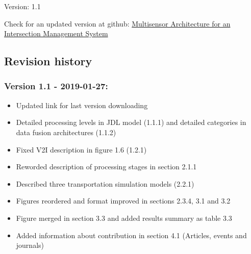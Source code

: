 \begin{titlepage}
    \begin{center}
%   
%        
%		        
%        
%        
%        
%		
%        
{}
Version: 1.1 \\
\vspace{2cm}

      
\end{center}
    
Check for an updated version at github: 
\href{https://github.com/gustavovelascoh/msc-report/wiki}{Multisensor Architecture for an Intersection Management System}


\subsection*{Revision history}
\subsubsection*{Version 1.1 - 2019-01-27:}

	\begin{itemize}
	\item Updated link for last version downloading
	\item Detailed processing levels in JDL model (1.1.1) and detailed categories in data fusion architectures (1.1.2)
	\item Fixed V2I description in figure 1.6 (1.2.1)
	\item Reworded description of processing stages in section 2.1.1
	\item Described three transportation simulation models (2.2.1)
	\item Figures reordered and format improved in sections 2.3.4, 3.1 and 3.2
	\item Figure merged in section 3.3 and added results summary as table 3.3
	\item Added information about contribution in section 4.1 (Articles, events and journals)
	\end{itemize}



\end{titlepage}
